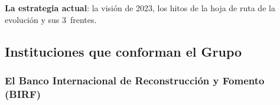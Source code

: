 \documentclass[11pt]{article}
\begin{document}
\begin{anotaciones}
\textbf{La estrategia actual}: la visión de 2023, los hitos de la hoja de ruta de la evolución y sus 3~frentes.
\begin{infografiacaja}
\caption{La estrategia del Grupo del Banco Mundial: visión, hoja de ruta y frentes}\label{figu:estrategia-gbm}
\end{infografiacaja}
\end{anotaciones}

\subsection{Instituciones que conforman el Grupo}\label{sec:gbm-instituciones}

\subsubsection{El Banco Internacional de Reconstrucción y Fomento (BIRF)}\label{sec:birf}
\end{document}
